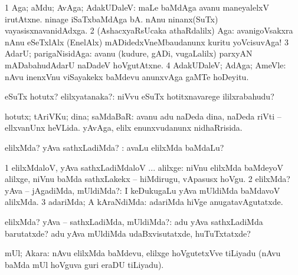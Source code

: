 {{{{{{\bentry
{} 
\gl{\saMavayx}
\expl{}
\bmng
\bnum
\num{1} Aga; aMdu; AvAga; AdakUDaleV:  maLe baMdAga avanu maneyalelxV irutAtxne.  ninage iSaTxbaMdAga bA.  nAnu ninanx(SuTx) vayasisxnavanidAdxga. 
\num{2} (AshacxyaRsUcaka athaRdalilx) Aga:  avanigoVsakxra nAnu eSeTxlAlx (EnelAlx) mADidedxVneMbaudanunx kuritu yoVcisuvAga! 
\num{3} AdarU; parigaNisidAga:  avanu (kudure, gADi, \mo vugaLalilx) parxyAN mADabahudAdarU naDadeV hoVgutAtxne. 
\num{4} AdakUDaleV; AdAga; AmeVle:  nAvu inenxVnu viSayakekx baMdevu anunxvAga gaMTe hoDeyitu. 
\enum
\emng
\eentry

\bentry
{} 
\gl{\nA}
\expl{}
\bmng
eSuTx hotutx? elilxyatanaka?:  niVvu eSuTx hotitxnavarege ililxrabahudu? 
\emng
\eentry

\bentry
{} 
\gl{\nA}
\expl{}
\bmng
hotutx; tAriVKu; dina; saMdaBaR:  avanu adu naDeda dina, naDeda riVti -- ellxvanUnx heVLida.  yAvAga, elilx enunxvudanunx nidhaRrisida. 
\emng
\eentry

\bentry
{} 
\gl{\kirxvi}
\expl{}
\bmng
elilxMda? yAva sathxLadiMda? :  avaLu elilxMda baMdaLu? 
\emng
\eentry

\bentry
{} 
\gl{\saMavayx}
\expl{}
\bmng
\bnum
\num{1} elilxMdaloV, yAva sathxLadiMdaloV ... alilxge:  niVnu elilxMda baMdeyoV alilxge, niVnu baMda sathxLakekx -- hiMdirugu, vApasusx hoVgu. 
\num{2} elilxMda? yAva -- jAgadiMda, mUldiMda?:  I keDukugaLu yAva mUldiMda baMdavoV alilxMda. 
\num{3} adariMda; A kAraNdiMda:  adariMda hiVge anugatavAgutatxde. 
\enum
\emng
\eentry

\bentry
{} 
\gl{\sanA}
\expl{}
\bmng
elilxMda? yAva -- sathxLadiMda, mUldiMda?:  adu yAva sathxLadiMda barutatxde?  adu yAva mUldiMda udaBxvisutatxde, huTuTxtatxde? 
\emng
\eentry

\bentry
{} 
\gl{\nA}
\expl{}
\bmng
mUl; Akara:  nAvu elilxMda baMdevu, elilxge hoVgutetxVve tiLiyadu (nAvu baMda mUl hoVguva guri eraDU tiLiyadu). 
\emng
\eentry

}}}}}}
